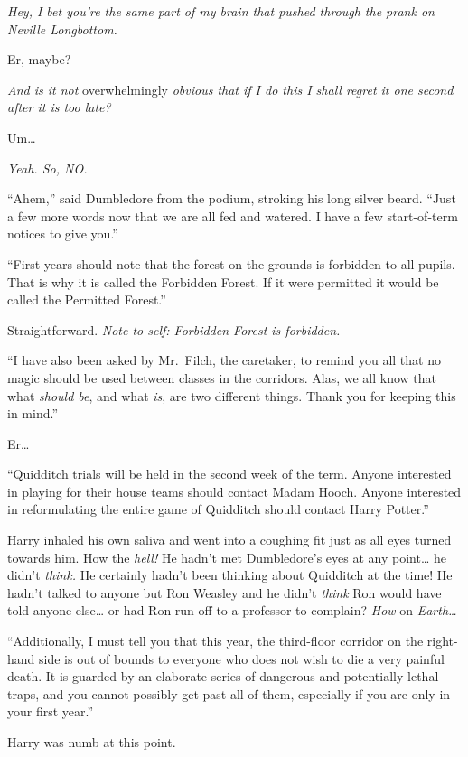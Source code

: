 \emph{Hey, I bet you're the same part of my brain that pushed through
the prank on Neville Longbottom.}

Er, maybe?

\emph{And is it not} overwhelmingly \emph{obvious that if I do this I
shall regret it one second after it is too late?}

Um\ldots{}

\emph{Yeah. So, NO.}

``Ahem,'' said Dumbledore from the podium, stroking his long silver
beard. ``Just a few more words now that we are all fed and watered. I
have a few start-of-term notices to give you.''

``First years should note that the forest on the grounds is forbidden to
all pupils. That is why it is called the Forbidden Forest. If it were
permitted it would be called the Permitted Forest.''

Straightforward. \emph{Note to self: Forbidden Forest is forbidden.}

``I have also been asked by Mr.~Filch, the caretaker, to remind you all
that no magic should be used between classes in the corridors. Alas, we
all know that what \emph{should be}, and what \emph{is}, are two
different things. Thank you for keeping this in mind.''

Er\ldots{}

``Quidditch trials will be held in the second week of the term. Anyone
interested in playing for their house teams should contact Madam Hooch.
Anyone interested in reformulating the entire game of Quidditch should
contact Harry Potter.''

Harry inhaled his own saliva and went into a coughing fit just as all
eyes turned towards him. How the \emph{hell!} He hadn't met Dumbledore's
eyes at any point\ldots{} he didn't \emph{think.} He certainly hadn't
been thinking about Quidditch at the time! He hadn't talked to anyone
but Ron Weasley and he didn't \emph{think} Ron would have told anyone
else\ldots{} or had Ron run off to a professor to complain? \emph{How}
on \emph{Earth\ldots{}}

``Additionally, I must tell you that this year, the third-floor corridor
on the right-hand side is out of bounds to everyone who does not wish to
die a very painful death. It is guarded by an elaborate series of
dangerous and potentially lethal traps, and you cannot possibly get past
all of them, especially if you are only in your first year.''

Harry was numb at this point.

